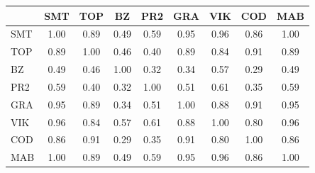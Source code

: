 \begin{tabular}{lcccccccc}
\hline
 & SMT & TOP & BZ & PR2 & GRA & VIK & COD & MAB \\
\hline
SMT & 1.00 & 0.89 & 0.49 & 0.59 & 0.95 & 0.96 & 0.86 & 1.00 \\
TOP & 0.89 & 1.00 & 0.46 & 0.40 & 0.89 & 0.84 & 0.91 & 0.89 \\
BZ & 0.49 & 0.46 & 1.00 & 0.32 & 0.34 & 0.57 & 0.29 & 0.49 \\
PR2 & 0.59 & 0.40 & 0.32 & 1.00 & 0.51 & 0.61 & 0.35 & 0.59 \\
GRA & 0.95 & 0.89 & 0.34 & 0.51 & 1.00 & 0.88 & 0.91 & 0.95 \\
VIK & 0.96 & 0.84 & 0.57 & 0.61 & 0.88 & 1.00 & 0.80 & 0.96 \\
COD & 0.86 & 0.91 & 0.29 & 0.35 & 0.91 & 0.80 & 1.00 & 0.86 \\
MAB & 1.00 & 0.89 & 0.49 & 0.59 & 0.95 & 0.96 & 0.86 & 1.00 \\
\hline
\end{tabular}